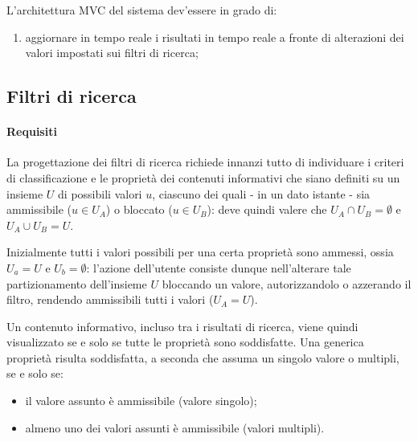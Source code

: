 L'architettura MVC del sistema dev'essere in grado di: 
\begin{enumerate}
	\item aggiornare in tempo reale i risultati in tempo reale a fronte di alterazioni dei valori impostati sui filtri di ricerca; %
\end{enumerate}
 
\subsection{Filtri di ricerca}
\label{sec:tesi:stage:gui:filtri}
\paragraph{Requisiti}
La progettazione dei filtri di ricerca richiede innanzi tutto di individuare i criteri di classificazione e le proprietà dei contenuti informativi che siano definiti su un insieme $U$ di possibili valori $u$, ciascuno dei quali - in un dato istante - sia ammissibile ($u \in U_A$) o bloccato ($u \in U_B$): deve quindi valere che $U_A \cap U_B = \emptyset$ e $U_A \cup U_B = U$.

Inizialmente tutti i valori possibili per una certa proprietà sono ammessi, ossia $U_a = U$ e $U_b = \emptyset$: l'azione dell'utente consiste dunque nell'alterare tale partizionamento dell'insieme $U$ bloccando un valore, autorizzandolo o azzerando il filtro, rendendo ammissibili tutti i valori ($U_A = U$).

Un contenuto informativo, incluso tra i risultati di ricerca, viene quindi visualizzato se e solo se tutte le proprietà sono soddisfatte. Una generica proprietà risulta soddisfatta, a seconda che assuma un singolo valore o multipli, se e solo se:
\begin{itemize}
\item il valore assunto è ammissibile (valore singolo);
\item almeno uno dei valori assunti è ammissibile (valori multipli).
\end{itemize}

